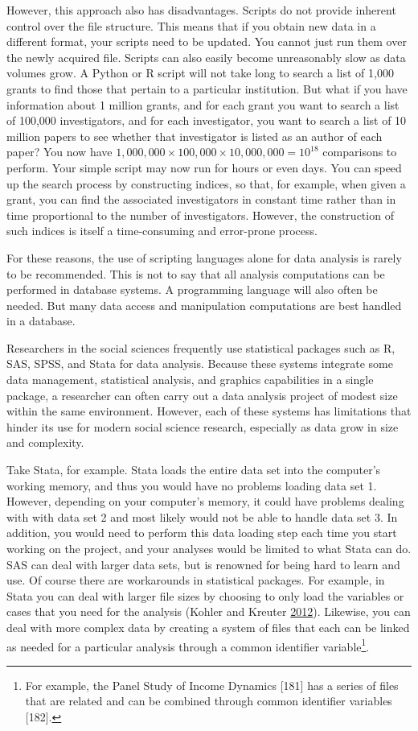\documentclass[]{krantz}
\begin{document}
However, this approach also has disadvantages. Scripts do not provide
inherent control over the file structure. This means that if you obtain
new data in a different format, your scripts need to be updated. You
cannot just run them over the newly acquired file. Scripts can also
easily become unreasonably slow as data volumes grow. A Python or R
script will not take long to search a list of 1,000 grants to find those
that pertain to a particular institution. But what if you have
information about 1 million grants, and for each grant you want to
search a list of 100,000 investigators, and for each investigator, you
want to search a list of 10 million papers to see whether that
investigator is listed as an author of each paper? You now have
\(1{,}000{,}000 \times 100{,}000 \times 10{,}000{,}000 = 10^{18}\)
comparisons to perform. Your simple script may now run for hours or even
days. You can speed up the search process by constructing indices, so
that, for example, when given a grant, you can find the associated
investigators in constant time rather than in time proportional to the
number of investigators. However, the construction of such indices is
itself a time-consuming and error-prone process.

For these reasons, the use of scripting languages alone for data
analysis is rarely to be recommended. This is not to say that all
analysis computations can be performed in database systems. A
programming language will also often be needed. But many data access and
manipulation computations are best handled in a database.

Researchers in the social sciences frequently use statistical packages
such as R, SAS, SPSS, and Stata for data analysis. Because these systems
integrate some data management, statistical analysis, and graphics
capabilities in a single package, a researcher can often carry out a
data analysis project of modest size within the same environment.
However, each of these systems has limitations that hinder its use for
modern social science research, especially as data grow in size and
complexity.

Take Stata, for example. Stata loads the entire data set into the
computer's working memory, and thus you would have no problems loading
data set 1. However, depending on your computer's memory, it could have
problems dealing with with data set 2 and most likely would not be able
to handle data set 3. In addition, you would need to perform this data
loading step each time you start working on the project, and your
analyses would be limited to what Stata can do. SAS can deal with larger
data sets, but is renowned for being hard to learn and use. Of course
there are workarounds in statistical packages. For example, in Stata you
can deal with larger file sizes by choosing to only load the variables
or cases that you need for the analysis (Kohler and Kreuter
\protect\hyperlink{ref-kohler2012datenanalyse}{2012}). Likewise, you can
deal with more complex data by creating a system of files that each can
be linked as needed for a particular analysis through a common
identifier variable\footnote{For example, the Panel Study of Income
  Dynamics {[}181{]} has a series of files that are related and can be
  combined through common identifier variables {[}182{]}.}.
\end{document}
